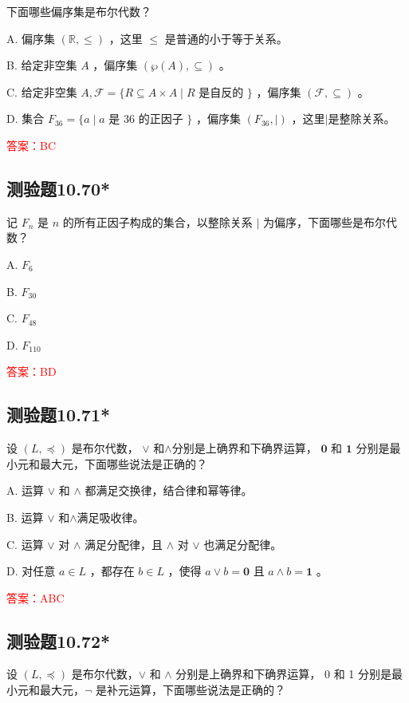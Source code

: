 \documentclass[UTF8, heading=true]{ctexart}
\begin{document}
下面哪些偏序集是布尔代数？

A. 偏序集 $(\mathbb{R}, \leq)$ ，这里 $\leq$ 是普通的小于等于关系。

B. 给定非空集 $A$ ，偏序集 $(\wp(A), \subseteq)$ 。

C. 给定非空集 $A, \mathcal{F}=\{R \subseteq A \times A \mid R$ 是自反的 $\}$ ，偏序集 $(\mathcal{F}, \subseteq)$ 。

D. 集合 $F_{36}=\{a \mid a$ 是 36 的正因子 $\}$ ，偏序集 $\left(F_{36}, \mid\right)$ ，这里$\mid$是整除关系。

\textcolor{red}{答案：BC}

\subsection{测验题10.70*}

记 $F_n$ 是 $n$ 的所有正因子构成的集合，以整除关系 $\mid$ 为偏序，下面哪些是布尔代数？

A. $ F_6$

B. $ F_{30}$

C. $F_{48}$

D. $ F_{110}$

\textcolor{red}{答案：BD}

\subsection{测验题10.71*}

设 $(L, \preceq)$ 是布尔代数， $\vee$ 和$\wedge$分别是上确界和下确界运算， $\mathbf{0}$ 和 $\mathbf{1}$ 分别是最小元和最大元，下面哪些说法是正确的？

A. 运算 $\vee$ 和 $\wedge$ 都满足交换律，结合律和幂等律。

B. 运算 $\vee$ 和$\wedge$满足吸收律。

C. 运算 $\vee$ 对 $\wedge$ 满足分配律，且 $\wedge$ 对 $\vee$ 也满足分配律。

D. 对任意 $a \in L$ ，都存在 $b \in L$ ，使得 $a \vee b=\mathbf{0}$ 且 $a \wedge b=\mathbf{1}$ 。

\textcolor{red}{答案：ABC}

\subsection{测验题10.72*}

设 $(L, \preceq)$ 是布尔代数，$\vee$ 和 $\wedge$ 分别是上确界和下确界运算， 0 和 1 分别是最小元和最大元，$\neg$ 是补元运算，下面哪些说法是正确的？
\end{document}
